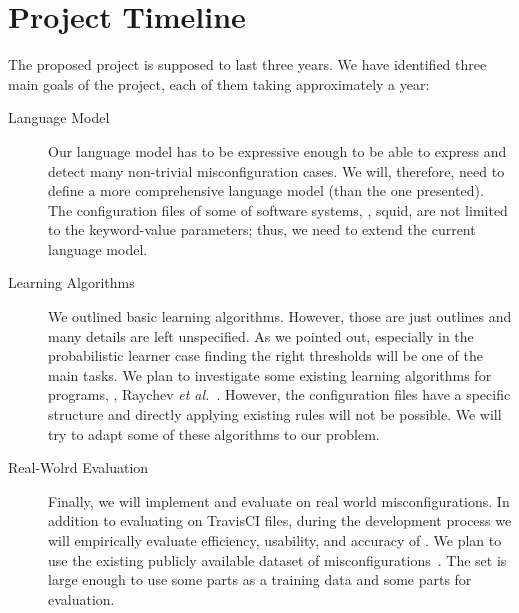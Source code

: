 
\section{Project Timeline}

The proposed project is supposed to last three years. We have identified three main 
goals of the project, each of them taking approximately a year:
\begin{description}
\item[Language Model] 
Our language model has to be expressive enough to be able to express and detect 
many non-trivial misconfiguration cases.
We will, therefore, need to define a more comprehensive language model (than the one presented).  The configuration files of some of software systems, 
\eg, squid, are not limited to the keyword-value parameters; thus,
we need to extend the current language model.
\item [Learning Algorithms]
We outlined basic learning algorithms. However, those are just outlines and
many details are left unspecified.
As we pointed out, especially in the 
probabilistic learner case finding the right thresholds will be one of the main tasks.
We plan to investigate some existing learning algorithms for programs, \eg,
Raychev {\em et al.}~\cite{raychev15predicting, raychev16learning}. 
However, the configuration files have a specific structure and directly applying 
existing rules will not be possible. We will try to adapt some of these algorithms 
to our problem.
\item [Real-Wolrd Evaluation]
Finally, we will implement and evaluate \app on real world misconfigurations.
In addition to evaluating \app on TravisCI files, during the development process 
we will empirically  evaluate efficiency, usability, and
accuracy of \app. We plan to use the existing publicly available dataset of 
misconfigurations~\cite{configdataset}. The set is large enough to use some parts as a  training data and some parts for evaluation.
\end{description}


